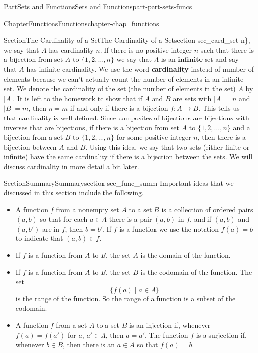 \documentclass[oneside,10pt,]{book}
\newcommand{\terminology}[1]{\textbf{#1}}
\numberwithin{equation}{chapter}
\begin{document}
\begin{partptx}{Part}{Sets and Functions}{}{Sets and Functions}{}{}{part-part-sets-funcs}
\begin{chapterptx}{Chapter}{Functions}{}{Functions}{}{}{chapter-chap_functions}
\begin{sectionptx}{Section}{The Cardinality of a Set}{}{The Cardinality of a Set}{}{}{section-sec_card_set}
n\}\), we say that \(A\) has cardinality \(n\). If there is no positive integer \(n\) such that there is a bijection from set \(A\) to \(\{1,2, \ldots,
n\}\) we say that \(A\) is an \terminology{infinite} set and say that \(A\) has infinite cardinality. We use the word \terminology{cardinality} instead of number of elements because we can't actually count the number of elements in an infinite set. We denote the cardinality of the set (the number of elements in the set) \(A\) by \(|A|\). It is left to the homework to show that if \(A\) and \(B\) are sets with \(|A|=n\) and \(|B| = m\), then \(n=m\) if and only if there is a bijection \(f: A \to B\). This tells us that cardinality is well defined. Since composites of bijections are bijections with inverses that are bijections, if there is a bijection from set \(A\) to \(\{1,2, \ldots,
n\}\) and a bijection from a set \(B\) to \(\{1,2, \ldots,
n\}\) for some positive integer \(n\), then there is a bijection between \(A\) and \(B\). Using this idea, we say that two sets (either finite or infinite) have the same cardinality if there is a bijection between the sets. We will discuss cardinality in more detail a bit later.%
\end{sectionptx}
%
%
\typeout{************************************************}
\typeout{************************************************}
%
\begin{sectionptx}{Section}{Summary}{}{Summary}{}{}{section-sec_func_summ}
Important ideas that we discussed in this section include the following.%
\begin{itemize}[label=\textbullet]
\item{}A function \(f\) from a nonempty set \(A\) to a set \(B\) is a collection of ordered pairs \((a,b)\) so that for each \(a \in A\) there is a pair \((a,b)\) in \(f\), and if \((a,b)\) and \((a,b')\) are in \(f\), then \(b=b'\). If \(f\) is a function we use the notation \(f(a) = b\) to indicate that \((a,b) \in f\).%
\item{}If \(f\) is a function from \(A\) to \(B\), the set \(A\) is the domain of the function.%
\item{}If \(f\) is a function from \(A\) to \(B\), the set \(B\) is the codomain of the function. The set%
\begin{equation*}
\{f(a) \mid a \in A\}
\end{equation*}
is the range of the function. So the range of a function is a subset of the codomain.%
\item{}A function \(f\) from a set \(A\) to a set \(B\) is an injection if, whenever \(f(a) = f(a')\) for \(a\), \(a' \in A\), then \(a = a'\). The function \(f\) is a surjection if, whenever \(b \in B\), then there is an \(a \in A\) so that \(f(a)=b\).%

\end{itemize}
\end{sectionptx}
\end{chapterptx}
\end{partptx}
\end{document}
